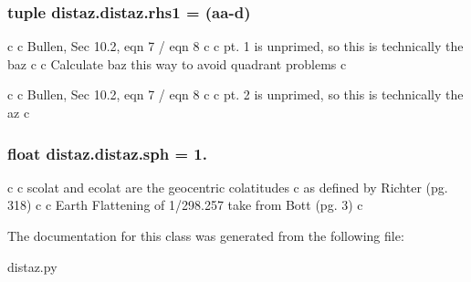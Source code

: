 \subsubsection[{rhs1}]{\setlength{\rightskip}{0pt plus 5cm}tuple distaz.\+distaz.\+rhs1 = ({\bf aa}-\/d)\hspace{0.3cm}{\ttfamily [static]}}\label{classdistaz_1_1distaz_a2a9ed83eb1131cefa14085e0b84e6486}
\begin{DoxyVerb}    c
    c  Bullen, Sec 10.2, eqn 7 / eqn 8
    c
    c    pt. 1 is unprimed, so this is technically the baz
    c
    c  Calculate baz this way to avoid quadrant problems
    c
\end{DoxyVerb}


\begin{DoxyVerb}    c
    c  Bullen, Sec 10.2, eqn 7 / eqn 8
    c
    c    pt. 2 is unprimed, so this is technically the az
    c\end{DoxyVerb}
 \hypertarget{classdistaz_1_1distaz_abe7e7f55263b7cfdd1658bad101a5ae3}{}
\subsubsection[{sph}]{\setlength{\rightskip}{0pt plus 5cm}float distaz.\+distaz.\+sph = 1.\hspace{0.3cm}{\ttfamily [static]}}\label{classdistaz_1_1distaz_abe7e7f55263b7cfdd1658bad101a5ae3}
\begin{DoxyVerb}    c
    c scolat and ecolat are the geocentric colatitudes
    c as defined by Richter (pg. 318)
    c
    c Earth Flattening of 1/298.257 take from Bott (pg. 3)
    c
\end{DoxyVerb}
 

The documentation for this class was generated from the following file\+:\begin{DoxyCompactItemize}
\item 
distaz.\+py\end{DoxyCompactItemize}
